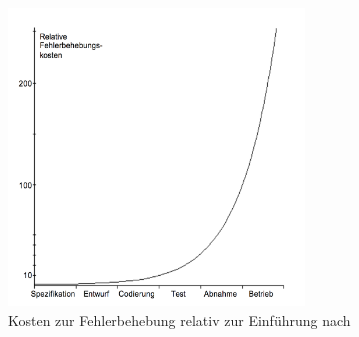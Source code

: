 \begin{figure}[h] 
  \centering
     \includegraphics[width=0.7\textwidth]{figures/spec_cost.png}
  \caption{Kosten zur Fehlerbehebung relativ zur Einführung nach \citeauthor{boehm_software_1981} \cite{boehm_software_1981}}
  \label{fig:spec_cost}
\end{figure}



















































